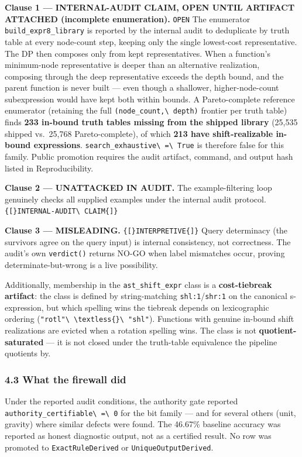 \documentclass[
  10pt,
]{article}
\DeclareRobustCommand{\texttt}[1]{{\paperSymbolFont\nolinkurl{#1}}}
\begin{document}
\textbf{Clause 1 --- INTERNAL-AUDIT CLAIM, OPEN UNTIL ARTIFACT ATTACHED (incomplete enumeration).} \texttt{OPEN} The enumerator \texttt{build\_expr8\_library} is reported by the internal audit to deduplicate by truth table at every node-count step, keeping only the single lowest-cost representative. The DP then composes only from kept representatives. When a function's minimum-node representative is deeper than an alternative realization, composing through the deep representative exceeds the depth bound, and the parent function is never built --- even though a shallower, higher-node-count subexpression would have kept both within bounds. A Pareto-complete reference enumerator (retaining the full \texttt{(node\_count,\ depth)} frontier per truth table) finds \textbf{233 in-bound truth tables missing from the shipped library} (25,535 shipped vs.~25,768 Pareto-complete), of which \textbf{213 have shift-realizable in-bound expressions}. \texttt{search\_exhaustive\ =\ True} is therefore false for this family. Public promotion requires the audit artifact, command, and output hash listed in Reproducibility.

\textbf{Clause 2 --- UNATTACKED IN AUDIT.} The example-filtering loop genuinely checks all supplied examples under the internal audit protocol. \texttt{{[}INTERNAL-AUDIT\ CLAIM{]}}

\textbf{Clause 3 --- MISLEADING.} \texttt{{[}INTERPRETIVE{]}} Query determinacy (the survivors agree on the query input) is internal consistency, not correctness. The audit's own \texttt{verdict()} returns NO-GO when label mismatches occur, proving determinate-but-wrong is a live possibility.

Additionally, membership in the \texttt{ast\_shift\_expr} class is a \textbf{cost-tiebreak artifact}: the class is defined by string-matching \texttt{shl:1}/\texttt{shr:1} on the canonical s-expression, but which spelling wins the tiebreak depends on lexicographic ordering (\texttt{"rotl"\ \textless{}\ "shl"}). Functions with genuine in-bound shift realizations are evicted when a rotation spelling wins. The class is not \textbf{quotient-saturated} --- it is not closed under the truth-table equivalence the pipeline quotients by.

\subsubsection{4.3 What the firewall did}\label{what-the-firewall-did}

Under the reported audit conditions, the authority gate reported \texttt{authority\_certifiable\ =\ 0} for the bit family --- and for several others (unit, gravity) where similar defects were found. The 46.67\% baseline accuracy was reported as honest diagnostic output, not as a certified result. No row was promoted to \texttt{ExactRuleDerived} or \texttt{UniqueOutputDerived}.
\end{document}
